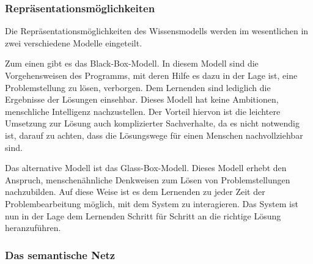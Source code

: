 \subsubsection{Repräsentationsmöglichkeiten}

Die Repräsentationsmöglichkeiten des Wissensmodells werden im wesentlichen in zwei verschiedene
Modelle eingeteilt.

Zum einen gibt es das \glqq Black-Box-Modell\grqq .
In diesem Modell sind die Vorgehensweisen des Programms, mit deren Hilfe es dazu
in der Lage ist, eine Problemstellung zu lösen, verborgen. Dem Lernenden sind lediglich
die Ergebnisse der Lösungen einsehbar. Dieses Modell hat keine Ambitionen, menschliche
Intelligenz nachzustellen. Der Vorteil hiervon ist die leichtere Umsetzung zur Lösung
auch komplizierter Sachverhalte, da es nicht notwendig ist, darauf zu achten, dass die
Lösungswege für einen Menschen nachvollziehbar sind.

Das alternative Modell ist das \glqq Glass-Box-Modell\grqq .
Dieses Modell erhebt den Anspruch, menschenähnliche Denkweisen zum Lösen von
Problemstellungen nachzubilden. Auf diese Weise ist es dem Lernenden zu jeder Zeit der
Problembearbeitung möglich, mit dem System zu interagieren. Das System ist nun in der Lage
dem Lernenden Schritt für Schritt an die richtige Lösung heranzuführen.


\subsubsection{Das semantische Netz}

